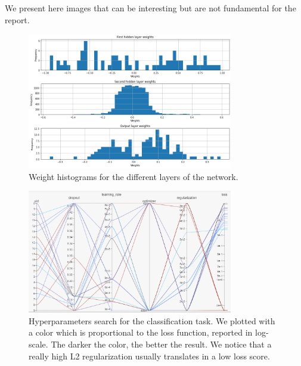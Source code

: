 We present here images that can be interesting but are not fundamental for the report.
\begin{figure}[h]
    \centering
    \includegraphics[width=0.8\textwidth]{Images/reg_weights.png}
    \caption{Weight histograms for the different layers of the network.}
    \label{fig:reg_weights}
\end{figure}

\begin{figure}[h]
    \centering
    \includegraphics[width=0.8\textwidth]{Images/hyperparams.PNG}
    \caption{Hyperparameters search for the classification task. We plotted with a color which is proportional to the loss function,
    reported in log-scale. The darker the color, the better the result. We notice that a really high L2 regularization 
    usually translates in a low loss score.}
    \label{fig:cl_hp}
\end{figure}